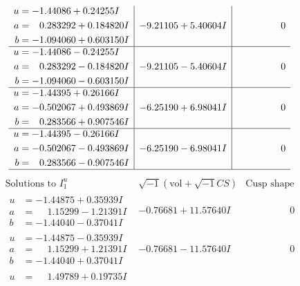 \documentclass[1p]{elsarticle_modified}
\theoremstyle{definition}
\newcommand{\I}{\sqrt{-1}}
\begin{document}
$$\begin{array}{c|c|c}
\begin{aligned}
u &= -1.44086 + 0.24255 I \\
a &= \phantom{-}0.283292 + 0.184820 I \\
b &= -1.094060 + 0.603150 I\end{aligned}
 & -9.21105 + 5.40604 I & \phantom{-0.000000 } 0 \\ \hline\begin{aligned}
u &= -1.44086 - 0.24255 I \\
a &= \phantom{-}0.283292 - 0.184820 I \\
b &= -1.094060 - 0.603150 I\end{aligned}
 & -9.21105 - 5.40604 I & \phantom{-0.000000 } 0 \\ \hline\begin{aligned}
u &= -1.44395 + 0.26166 I \\
a &= -0.502067 + 0.493869 I \\
b &= \phantom{-}0.283566 + 0.907546 I\end{aligned}
 & -6.25190 + 6.98041 I & \phantom{-0.000000 } 0 \\ \hline\begin{aligned}
u &= -1.44395 - 0.26166 I \\
a &= -0.502067 - 0.493869 I \\
b &= \phantom{-}0.283566 - 0.907546 I\end{aligned}
 & -6.25190 - 6.98041 I & \phantom{-0.000000 } 0\\
 \hline 
 \end{array}$$\newpage$$\begin{array}{c|c|c}  
\text{Solutions to }I^u_{1}& \I (\text{vol} + \sqrt{-1}CS) & \text{Cusp shape}\\
 \hline 
\begin{aligned}
u &= -1.44875 + 0.35939 I \\
a &= \phantom{-}1.15299 - 1.21391 I \\
b &= -1.44040 - 0.37041 I\end{aligned}
 & -0.76681 + 11.57640 I & \phantom{-0.000000 } 0 \\ \hline\begin{aligned}
u &= -1.44875 - 0.35939 I \\
a &= \phantom{-}1.15299 + 1.21391 I \\
b &= -1.44040 + 0.37041 I\end{aligned}
 & -0.76681 - 11.57640 I & \phantom{-0.000000 } 0 \\ \hline\begin{aligned}
u &= \phantom{-}1.49789 + 0.19735 I \\

\end{aligned}
\end{array}$$
\end{document}
